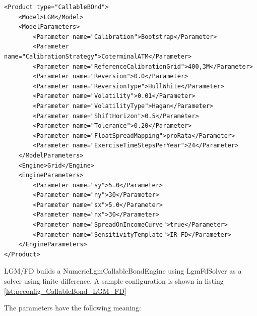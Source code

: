 \begin{longlisting}
\begin{verbatim}
<Product type="CallableBOnd">
    <Model>LGM</Model>
    <ModelParameters>
        <Parameter name="Calibration">Bootstrap</Parameter>
        <Parameter name="CalibrationStrategy">CoterminalATM</Parameter>
        <Parameter name="ReferenceCalibrationGrid">400,3M</Parameter>
        <Parameter name="Reversion">0.0</Parameter>
        <Parameter name="ReversionType">HullWhite</Parameter>
        <Parameter name="Volatility">0.01</Parameter>
        <Parameter name="VolatilityType">Hagan</Parameter>
        <Parameter name="ShiftHorizon">0.5</Parameter>
        <Parameter name="Tolerance">0.20</Parameter>
        <Parameter name="FloatSpreadMapping">proRata</Parameter>
        <Parameter name="ExerciseTimeStepsPerYear">24</Parameter>
    </ModelParameters>
    <Engine>Grid</Engine>
    <EngineParameters>
        <Parameter name="sy">5.0</Parameter>
        <Parameter name="ny">30</Parameter>
        <Parameter name="sx">5.0</Parameter>
        <Parameter name="nx">30</Parameter>
        <Parameter name="SpreadOnIncomeCurve">true</Parameter>
        <Parameter name="SensitivityTemplate">IR_FD</Parameter>
    </EngineParameters>
</Product>
\end{verbatim}
\caption{Configuration for Product CallableBond, Model LGM, Engine Grid}
\label{lst:peconfig_CallableBond_LGM_Grid}
\end{longlisting}

LGM/FD builds a NumericLgmCallableBondEngine using LgmFdSolver as a solver using finite difference. A sample
configuration is shown in listing \ref{lst:peconfig_CallableBond_LGM_FD}

The parameters have the following meaning:

